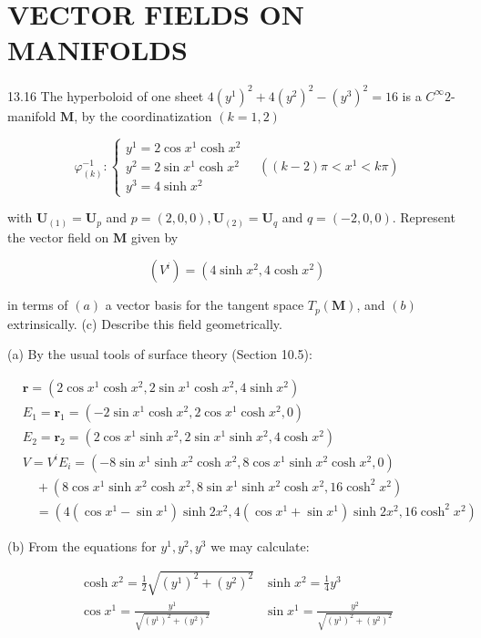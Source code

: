 \documentclass[10pt]{article}
\begin{document}
\section*{VECTOR FIELDS ON MANIFOLDS}
13.16 The hyperboloid of one sheet $4\left(y^{1}\right)^{2}+4\left(y^{2}\right)^{2}-\left(y^{3}\right)^{2}=16$ is a $C^{\infty} 2$-manifold $\mathbf{M}$, by the coordinatization $(k=1,2)$

$$
\varphi_{(k)}^{-1}:\left\{\begin{array}{l}
y^{1}=2 \cos x^{1} \cosh x^{2} \\
y^{2}=2 \sin x^{1} \cosh x^{2} \\
y^{3}=4 \sinh x^{2}
\end{array} \quad\left((k-2) \pi<x^{1}<k \pi\right)\right.
$$

with $\mathbf{U}_{(1)}=\mathbf{U}_{p}$ and $p=(2,0,0), \mathbf{U}_{(2)}=\mathbf{U}_{q}$ and $q=(-2,0,0)$. Represent the vector field on $\mathbf{M}$ given by

$$
\left(V^{i}\right)=\left(4 \sinh x^{2}, 4 \cosh x^{2}\right)
$$

in terms of $(a)$ a vector basis for the tangent space $T_{p}(\mathbf{M})$, and $(b)$ extrinsically. (c) Describe this field geometrically.

(a) By the usual tools of surface theory (Section 10.5):

$$
\begin{aligned}
& \mathbf{r}=\left(2 \cos x^{1} \cosh x^{2}, 2 \sin x^{1} \cosh x^{2}, 4 \sinh x^{2}\right) \\
& E_{1}=\mathbf{r}_{1}=\left(-2 \sin x^{1} \cosh x^{2}, 2 \cos x^{1} \cosh x^{2}, 0\right) \\
& E_{2}=\mathbf{r}_{2}=\left(2 \cos x^{1} \sinh x^{2}, 2 \sin x^{1} \sinh x^{2}, 4 \cosh x^{2}\right) \\
& V=V^{i} E_{i}=\left(-8 \sin x^{1} \sinh x^{2} \cosh x^{2}, 8 \cos x^{1} \sinh x^{2} \cosh x^{2}, 0\right) \\
& \quad+\left(8 \cos x^{1} \sinh x^{2} \cosh x^{2}, 8 \sin x^{1} \sinh x^{2} \cosh x^{2}, 16 \cosh ^{2} x^{2}\right) \\
& \quad=\left(4\left(\cos x^{1}-\sin x^{1}\right) \sinh 2 x^{2}, 4\left(\cos x^{1}+\sin x^{1}\right) \sinh 2 x^{2}, 16 \cosh ^{2} x^{2}\right)
\end{aligned}
$$

(b) From the equations for $y^{1}, y^{2}, y^{3}$ we may calculate:

$$
\begin{array}{ll}
\cosh x^{2}=\frac{1}{2} \sqrt{\left(y^{1}\right)^{2}+\left(y^{2}\right)^{2}} & \sinh x^{2}=\frac{1}{4} y^{3} \\
\cos x^{1}=\frac{y^{1}}{\sqrt{\left(y^{1}\right)^{2}+\left(y^{2}\right)^{2}}} & \sin x^{1}=\frac{y^{2}}{\sqrt{\left(y^{1}\right)^{2}+\left(y^{2}\right)^{2}}}
\end{array}
$$
\end{document}
